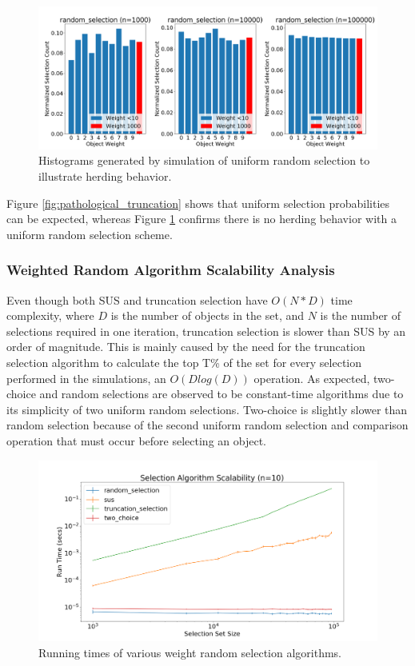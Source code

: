 \documentclass[12pt]{article}
\begin{document}
    \begin{figure}[htbp]
      \centering
      \includegraphics[scale=0.32]{images/pathological_random.png} 
      \caption{Histograms generated by simulation of uniform random selection
               to illustrate herding behavior.}
      \label{fig:pathological_random}
    \end{figure}

    Figure \ref{fig:pathological_truncation} shows that uniform selection
    probabilities can be expected, whereas Figure \ref{fig:pathological_random}
    confirms there is no herding behavior with a uniform random selection
    scheme.

    \subsubsection{Weighted Random Algorithm Scalability Analysis}
    Even though both SUS and truncation selection have $O(N * D)$ time
    complexity, where $D$ is the number of objects in the set, and $N$ is the number of
    selections required in one iteration, truncation selection is slower than
    SUS by an order of magnitude. This is mainly caused by the need for the
    truncation selection algorithm to calculate the top T\% of the set for
    every selection performed in the simulations, an $O(Dlog(D))$ operation. As
    expected, two-choice and random selections are observed to be constant-time
    algorithms due to its simplicity of two uniform random selections.
    Two-choice is slightly slower than random selection because of the second
    uniform random selection and comparison operation that must occur before
    selecting an object.

    \begin{figure}[htbp]
      \centering
      \includegraphics[scale=0.28]{images/random_scalability.png} 
      \caption{Running times of various weight random selection algorithms.}
      \label{fig:random_scalability}
    \end{figure}
\end{document}
